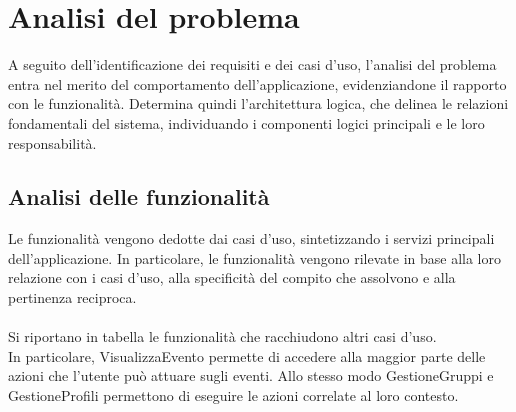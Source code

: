 \section{Analisi del problema}

A seguito dell'identificazione dei requisiti e dei casi d'uso,
l'analisi del problema entra nel merito del comportamento dell'applicazione,
evidenziandone il rapporto con le funzionalità.
Determina quindi l'architettura logica, che delinea le relazioni fondamentali del sistema,
individuando i componenti logici principali e le loro responsabilità.\\

\subsection{Analisi delle funzionalità}

Le funzionalità vengono dedotte dai casi d'uso,
sintetizzando i servizi principali dell'applicazione.
In particolare, le funzionalità vengono rilevate in base alla loro relazione con i casi d'uso,
alla specificità del compito che assolvono e alla pertinenza reciproca.\\
\\
Si riportano in tabella le funzionalità che racchiudono altri casi d'uso.\\
In particolare, VisualizzaEvento permette di accedere alla maggior parte delle azioni
che l'utente può attuare sugli eventi.
Allo stesso modo GestioneGruppi e GestioneProfili
permettono di eseguire le azioni correlate al loro contesto.\\

